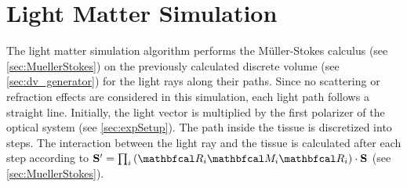 \section{Light Matter Simulation}
\label{sec:simulation}
%
The light matter simulation algorithm performs the M{\"u}ller-Stokes calculus (see \cref{sec:MuellerStokes}) on the previously calculated discrete volume (see \cref{sec:dv_generator}) for the light rays along their paths.
Since no scattering or refraction effects are considered in this simulation, each light path follows a straight line.
Initially, the light vector is multiplied by the first polarizer of the optical system (see \cref{sec:expSetup}).
The path inside the tissue is discretized into steps.
The interaction between the light ray and the tissue is calculated after each step according to $ \vec{S}' = \prod_i \left(\mat{R}_i \mat{M}_i \mat{R}_i\right) \cdot \vec{S}$ (see \cref{sec:MuellerStokes}).
% 
%
%
